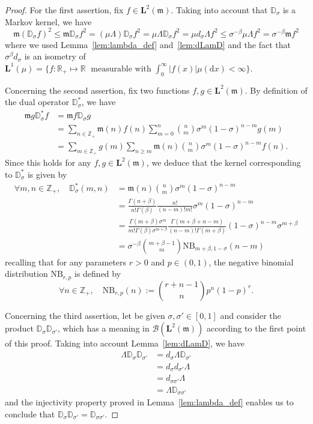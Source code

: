 \documentclass[10pt]{amsart}
\theoremstyle{definition}\newtheorem{defi}[theo]{Definition}\newtheorem{rema}[theo]{Remark}\newtheorem{exam}[theo]{Example}\newtheorem{exem}[theo]{Example}\newtheorem{nota}[theo]{Notation}
\newcommand{\df}{\mathrel{:=}}
\newcommand{\cB}{{\mathcal B}}
\newcommand{\RR}{\mathbb{R}}
\newcommand{\ZZ}{\mathbb{Z}}
\newcommand{\fm}{\mathfrak{m}}
\newcommand{\esL}{\mathbf{L}}
\newcommand*\R{{\mathbb R}}
\newcommand{\discret}[1]{\mathds{#1}}
\let\oldforall\forall
\renewcommand*{\forall}{\mathrel{\oldforall}}
\newcommand*{\dd}{\mathrm{d}}
\newcommand*{\dx}{\dd x}
\begin{document}
\begin{proof}
For the first assertion, fix $f\in\esL^2(\fm)$. Taking into account that $\discret{D}_{\sigma}$ is a Markov kernel, we have
\[
\fm(\discret{D}_{\sigma}f)^2\leq \fm\discret{D}_{\sigma}f^2 =(\mu \Lambda)\discret{D}_{\sigma}f^2 =\mu \Lambda \discret{D}_{\sigma}f^2 =\mu d_{\sigma}\Lambda f^2
\leq {\sigma}^{-\beta}\mu \Lambda f^2 ={\sigma}^{-\beta} \fm f^2
\]
where we used Lemma~\ref{lem:lambda_def} and~\ref{lem:dLamD} and the fact that ${\sigma}^{\beta}d_{\sigma}$ is an isometry of $\esL^1(\mu)=\{f :\RR_+\mapsto \R \; \text{ measurable with } \int_{0}^{\infty}|f(x)| \mu(\dx)<\infty\}$.

Concerning the second assertion, fix two functions $f,g\in\esL^2(\fm)$. By definition of the dual operator $\discret{D}_{\sigma}^*$, we have
\begin{align*}
\fm g \discret{D}_{\sigma}^* f&=\fm f\discret{D}_{\sigma} g\\
&=\sum_{n\in\ZZ_+}\fm(n)f(n)\sum_{m=0}^n \binom{n}{m} {\sigma}^m(1-{\sigma})^{n-m} g(m)\\
&=\sum_{m\in\ZZ_+}g(m)\sum_{n\geq m}\fm(n)\binom{n}{m} {\sigma}^m(1-{\sigma})^{n-m}f(n).
\end{align*}
Since this holds for any $f,g\in\esL^2(\fm)$, we deduce that the kernel corresponding to $\discret{D}_{\sigma}^*$ is given by
\begin{align*}
\forall m,n\in\ZZ_+,\quad
\discret{D}_{\sigma}^*(m,n)&=\fm(n)\binom{n}{m} {\sigma}^m(1-{\sigma})^{n-m}\\
&=\frac{\Gamma(n+\beta)}{n!\Gamma(\beta)}\frac{n!}{(n-m)! m!}{\sigma}^m(1-{\sigma})^{n-m}\\
&=\frac{\Gamma(m+\beta){\sigma}^m}{m!\Gamma(\beta){\sigma}^{m+\beta}}\frac{\Gamma(m+\beta+n-m)}{(n-m)!\Gamma(m+\beta)}(1-{\sigma})^{n-m}{\sigma}^{m+\beta}\\
&={\sigma}^{-\beta}\binom{m+\beta-1}{m}\mathrm{NB}_{m+\beta,1-{\sigma}}(n-m)
\end{align*}
recalling that for any parameters $r>0$ and $p\in(0,1)$, the negative binomial distribution $\mathrm{NB}_{r,p}$ is defined by
\[
\forall n\in\ZZ_+,\quad \mathrm{NB}_{r,p}(n)\df \binom{r+n-1}{n}p^n(1-p)^{r}.
\]


Concerning the third assertion, let be given ${\sigma},{\sigma}'\in[0,1]$ and consider the product $\discret{D}_{\sigma}\discret{D}_{{\sigma}'}$, which has a meaning in $\cB(\esL^2(\fm))$ according to the first point of this proof. Taking into account Lemma~\ref{lem:dLamD}, we have
\begin{align*}
\Lambda \discret{D}_{\sigma}\discret{D}_{{\sigma}'}&=d_{\sigma}\Lambda \discret{D}_{{\sigma}'}\\
&=d_{\sigma}d_{{\sigma}'}\Lambda\\
&=d_{{\sigma}{\sigma}'}\Lambda\\
&=\Lambda\discret{D}_{{\sigma}{\sigma}'}
\end{align*}
and the injectivity property proved in Lemma~\ref{lem:lambda_def} enables us to conclude that $\discret{D}_{\sigma}\discret{D}_{{\sigma}'}=\discret{D}_{{\sigma}{\sigma}'}$.
\end{proof}
\end{document}
